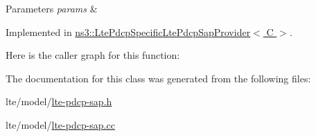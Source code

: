 \begin{DoxyParams}{Parameters}
{\em params} & \\
\hline
\end{DoxyParams}


Implemented in \hyperlink{classns3_1_1LtePdcpSpecificLtePdcpSapProvider_a3f5cc89e7e16df8bc1b08e6337625fe4}{ns3\+::\+Lte\+Pdcp\+Specific\+Lte\+Pdcp\+Sap\+Provider$<$ C $>$}.



Here is the caller graph for this function\+:




The documentation for this class was generated from the following files\+:\begin{DoxyCompactItemize}
\item 
lte/model/\hyperlink{lte-pdcp-sap_8h}{lte-\/pdcp-\/sap.\+h}\item 
lte/model/\hyperlink{lte-pdcp-sap_8cc}{lte-\/pdcp-\/sap.\+cc}\end{DoxyCompactItemize}
